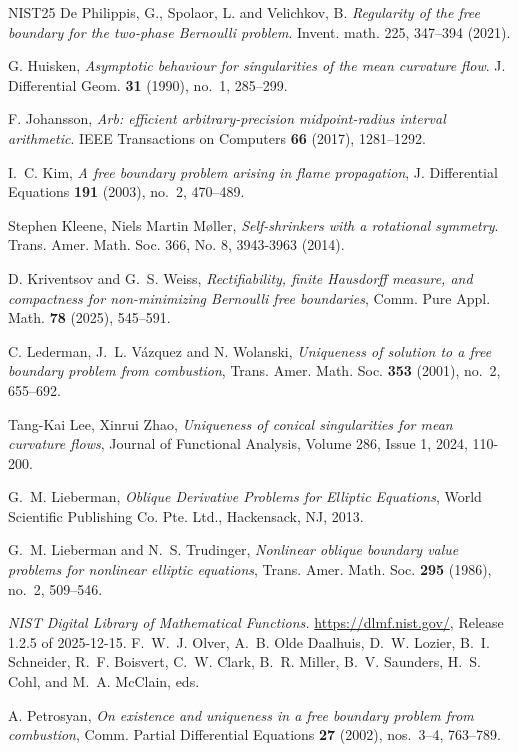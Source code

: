 \documentclass[11pt]{article}
\numberwithin{equation}{section}
\theoremstyle{definition}
\begin{document}
\begin{thebibliography}{NIST25}
 De Philippis, G., Spolaor, L. and Velichkov, B. \textit{Regularity of the free boundary for the two-phase Bernoulli problem}. Invent. math. 225, 347–394 (2021).

 G. Huisken, \textit{Asymptotic behaviour for singularities of the mean curvature flow}. J. Differential Geom. {\bf 31} (1990), no.~1, 285--299.


 F. Johansson, \textit{Arb: efficient arbitrary-precision midpoint-radius interval arithmetic}. IEEE Transactions on Computers {\bf 66} (2017), 1281--1292.

 I.~C. Kim, \textit{A free boundary problem arising in flame propagation}, J. Differential Equations {\bf 191} (2003), no.~2, 470--489.

 Stephen Kleene, Niels Martin M{\o}ller, \textit{Self-shrinkers with a rotational symmetry}. Trans. Amer. Math. Soc. 366, No. 8, 3943-3963 (2014).

 D. Kriventsov and G.~S. Weiss, \textit{Rectifiability, finite Hausdorff measure, and compactness for non-minimizing Bernoulli free boundaries}, Comm. Pure Appl. Math. {\bf 78} (2025), 545--591.

 C. Lederman, J.~L. V\'azquez and N. Wolanski, \textit{Uniqueness of solution to a free boundary problem from combustion}, Trans. Amer. Math. Soc. {\bf 353} (2001), no.~2, 655--692.

 Tang-Kai Lee, Xinrui Zhao, \textit{Uniqueness of conical singularities for mean curvature flows},
Journal of Functional Analysis,
Volume 286, Issue 1, 2024, 110-200.

 G.~M. Lieberman, \textit{Oblique Derivative Problems for Elliptic Equations}, World Scientific Publishing Co. Pte. Ltd., Hackensack, NJ, 2013.

 G.~M. Lieberman and N.~S. Trudinger, \textit{Nonlinear oblique boundary value problems for nonlinear elliptic equations}, Trans. Amer. Math. Soc. {\bf 295} (1986), no.~2, 509--546.

{\it NIST Digital Library of Mathematical Functions.}
\url{https://dlmf.nist.gov/}, Release 1.2.5 of 2025-12-15.
F.~W.~J. Olver, A.~B. Olde Daalhuis, D.~W. Lozier, B.~I. Schneider,
R.~F. Boisvert, C.~W. Clark, B.~R. Miller, B.~V. Saunders,
H.~S. Cohl, and M.~A. McClain, eds.

 A. Petrosyan, \textit{On existence and uniqueness in a free boundary problem from combustion}, Comm. Partial Differential Equations {\bf 27} (2002), nos.~3--4, 763--789.


\end{thebibliography}
\end{document}

